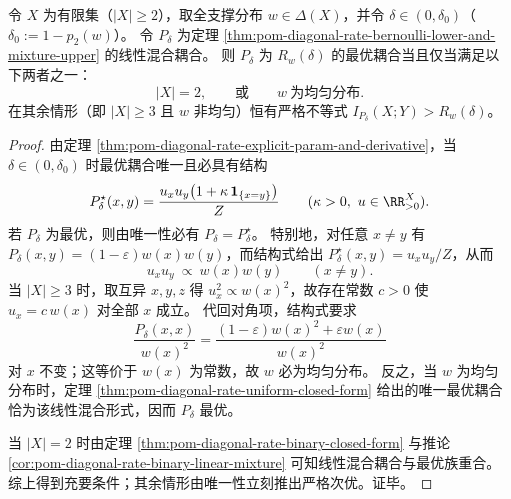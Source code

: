 \begin{theorem}[线性混合耦合的最优性判别]\label{thm:pom-diagonal-rate-mixture-optimality-criterion}
令 \(X\) 为有限集（\(|X|\ge 2\)），取全支撑分布 \(w\in\Delta(X)\)，并令 \(\delta\in(0,\delta_0)\)（\(\delta_0:=1-p_2(w)\)）。
令 \(P_\delta\) 为定理 \ref{thm:pom-diagonal-rate-bernoulli-lower-and-mixture-upper} 的线性混合耦合。
则 \(P_\delta\) 为 \(R_w(\delta)\) 的最优耦合当且仅当满足以下两者之一：
\[
|X|=2,\qquad\text{或}\qquad w\ \text{为均匀分布}.
\]
在其余情形（即 \(|X|\ge 3\) 且 \(w\) 非均匀）恒有严格不等式 \(I_{P_\delta}(X;Y)>R_w(\delta)\)。
\end{theorem}
\begin{proof}
由定理 \ref{thm:pom-diagonal-rate-explicit-param-and-derivative}，当 \(\delta\in(0,\delta_0)\) 时最优耦合唯一且必具有结构
\[
P^\star_\delta(x,y)=\frac{u_xu_y\bigl(1+\kappa\,\mathbf 1_{\{x=y\}}\bigr)}{Z}
\qquad(\kappa>0,\ u\in\RR_{>0}^X).
\]
若 \(P_\delta\) 为最优，则由唯一性必有 \(P_\delta=P^\star_\delta\)。
特别地，对任意 \(x\ne y\) 有 \(P_\delta(x,y)=(1-\varepsilon)w(x)w(y)\)，而结构式给出 \(P^\star_\delta(x,y)=u_xu_y/Z\)，从而
\[
u_xu_y\ \propto\ w(x)w(y)\qquad(x\ne y).
\]
当 \(|X|\ge 3\) 时，取互异 \(x,y,z\) 得
\(
u_x^2\propto w(x)^2
\)，故存在常数 \(c>0\) 使 \(u_x=c\,w(x)\) 对全部 \(x\) 成立。
代回对角项，结构式要求
\[
\frac{P_\delta(x,x)}{w(x)^2}=\frac{(1-\varepsilon)w(x)^2+\varepsilon w(x)}{w(x)^2}
\]
对 \(x\) 不变；这等价于 \(w(x)\) 为常数，故 \(w\) 必为均匀分布。
反之，当 \(w\) 为均匀分布时，定理 \ref{thm:pom-diagonal-rate-uniform-closed-form} 给出的唯一最优耦合恰为该线性混合形式，因而 \(P_\delta\) 最优。
\par
当 \(|X|=2\) 时由定理 \ref{thm:pom-diagonal-rate-binary-closed-form} 与推论 \ref{cor:pom-diagonal-rate-binary-linear-mixture} 可知线性混合耦合与最优族重合。
综上得到充要条件；其余情形由唯一性立刻推出严格次优。证毕。
\end{proof}



\endinput
